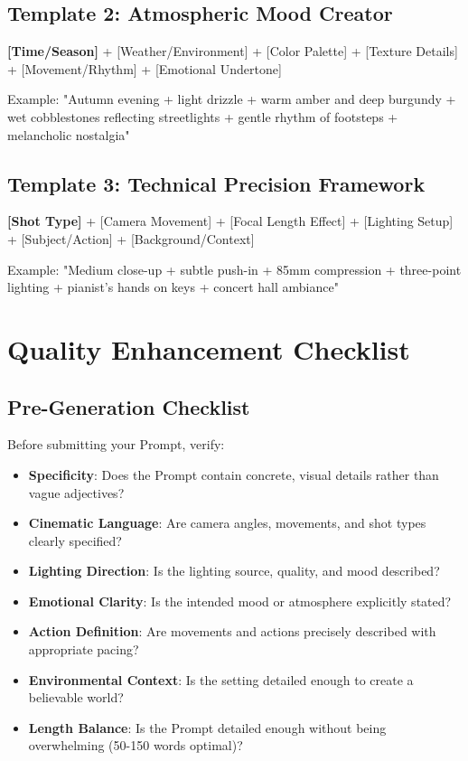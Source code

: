 \subsection*{Template 2: Atmospheric Mood Creator}
\begin{Prompt}
\textbf{[Time/Season]} + [Weather/Environment] + [Color Palette] + [Texture Details] + [Movement/Rhythm] + [Emotional Undertone]

Example: "Autumn evening + light drizzle + warm amber and deep burgundy + wet cobblestones reflecting streetlights + gentle rhythm of footsteps + melancholic nostalgia"
\end{Prompt}

\subsection*{Template 3: Technical Precision Framework}
\begin{Prompt}
\textbf{[Shot Type]} + [Camera Movement] + [Focal Length Effect] + [Lighting Setup] + [Subject/Action] + [Background/Context]

Example: "Medium close-up + subtle push-in + 85mm compression + three-point lighting + pianist's hands on keys + concert hall ambiance"
\end{Prompt}

\section*{Quality Enhancement Checklist}

\subsection*{Pre-Generation Checklist}
Before submitting your Prompt, verify:

\begin{itemize}
\item[$\square$] \textbf{Specificity}: Does the Prompt contain concrete, visual details rather than vague adjectives?
\item[$\square$] \textbf{Cinematic Language}: Are camera angles, movements, and shot types clearly specified?
\item[$\square$] \textbf{Lighting Direction}: Is the lighting source, quality, and mood described?
\item[$\square$] \textbf{Emotional Clarity}: Is the intended mood or atmosphere explicitly stated?
\item[$\square$] \textbf{Action Definition}: Are movements and actions precisely described with appropriate pacing?
\item[$\square$] \textbf{Environmental Context}: Is the setting detailed enough to create a believable world?
\item[$\square$] \textbf{Length Balance}: Is the Prompt detailed enough without being overwhelming (50-150 words optimal)?
\end{itemize}

